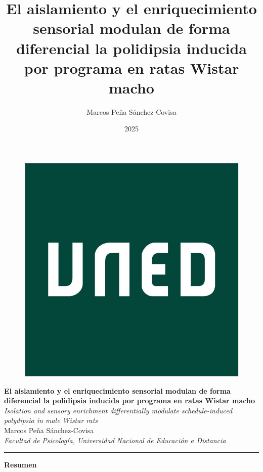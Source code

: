 \documentclass[12pt,a4paper]{article}
\title{El aislamiento y el enriquecimiento sensorial modulan de forma diferencial la polidipsia inducida por programa en ratas Wistar macho}
\author{Marcos Peña Sánchez-Covisa}
\date{2025}
\begin{document}
\begin{figure}[H]
    \raggedleft
    \includegraphics[scale=0.04]{LogoUNED.jpg}
\end{figure}

\begin{center}
    {\Large \textbf{El aislamiento y el enriquecimiento sensorial modulan de forma diferencial la polidipsia inducida por programa en ratas Wistar macho}} \\
    \vspace{1mm}
    {\normalsize \textit{Isolation and sensory enrichment differentially modulate schedule-induced polydipsia in male Wistar rats}} \\
    \vspace{5mm}
    {\large Marcos Peña Sánchez-Covisa} \\
    \vspace{3mm}
    \textit{Facultad de Psicología, Universidad Nacional de Educación a Distancia}
\end{center}

\begin{center}
    \textcolor{azul}{\rule{150mm}{0.5mm}}
    \end{center}
    
    \begin{center}
    \textbf{\large Resumen}
    \end{center}
    
\end{document}
